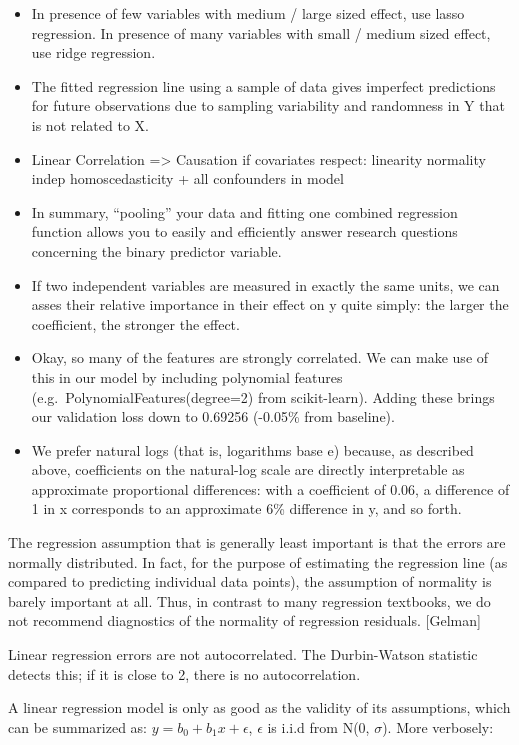 \documentclass[]{book}
\begin{document}
\begin{itemize}
\item
  In presence of few variables with medium / large sized effect, use lasso regression. In presence of many variables with small / medium sized effect, use ridge regression.
\item
  The fitted regression line using a sample of data gives imperfect predictions for future observations due to sampling variability and randomness in Y that is not related to X.
\item
  Linear Correlation =\textgreater{} Causation if covariates respect: linearity normality indep homoscedasticity + all confounders in model
\item
  In summary, ``pooling'' your data and fitting one combined regression function allows you to easily and efficiently answer research questions concerning the binary predictor variable.
\item
  If two independent variables are measured in exactly the same units, we can asses their relative importance in their effect on y quite simply: the larger the coefficient, the stronger the effect.
\item
  Okay, so many of the features are strongly correlated. We can make use of this in our model by including polynomial features (e.g.~PolynomialFeatures(degree=2) from scikit-learn). Adding these brings our validation loss down to 0.69256 (-0.05\% from baseline).
\item
  We prefer natural logs (that is, logarithms base e) because, as described above, coefficients on the natural-log scale are directly interpretable as approximate proportional differences: with a coefficient of 0.06, a difference of 1 in x corresponds to an approximate 6\% difference in y, and so forth.
\end{itemize}

The regression assumption that is generally least important is that the errors are normally distributed. In fact, for the purpose of estimating the regression line (as compared to predicting individual data points), the assumption of normality is barely important at all. Thus, in contrast to many regression textbooks, we do not recommend diagnostics of the normality of regression residuals. {[}Gelman{]}

Linear regression errors are not autocorrelated. The Durbin-Watson statistic detects this; if it is close to 2, there is no autocorrelation.

A linear regression model is only as good as the validity of its assumptions, which can be summarized as: \(y = b_0+b_1x + \epsilon\), \(\epsilon\) is i.i.d from N(0, \(\sigma\)). More verbosely:
\end{document}

